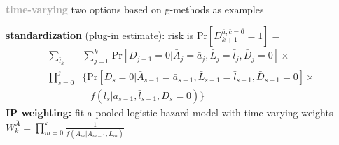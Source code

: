 \documentclass[8pt,twoside]{extarticle}
\begin{document}
\begin{multicols}{2}
\vspace{0.2em}
\noindent \colorbox{lightgray!20!white}{\begin{minipage}{28em}




\textbf{\textcolor{darkgray}{time-varying}} two options based on g-methods as examples

\noindent \textbf{standardization} (plug-in estimate): risk is $\mathrm{Pr}\left[D_{k+1}^{\bar{a},\bar{c}=\bar{0}}=1\right] =$ \vspace{-0.5em}
\begin{align*}%
 \sum_{\bar{l}_k}&\sum_{j=0}^k \mathrm{Pr}\left[D_{j+1}=0|\bar{A}_j=\bar{a}_j, \bar{L}_j=\bar{l}_j, \bar{D}_j=0\right] \times \\[-0.1em]
\prod_{s=0}^j & \Big\{  \mathrm{Pr}\left[D_s=0|\bar{A}_{s-1}=\bar{a}_{s-1}, \bar{L}_{s-1}=\bar{l}_{s-1}, \bar{D}_{s-1}=0\right] \times  \\[-0.7em]
   &   \,\,\,\,\, f\left(l_s|\bar{a}_{s-1}, \bar{l}_{s-1}, D_s=0\right)\Big\}
\end{align*}
\noindent \textbf{IP weighting:} fit a pooled logistic hazard model with time-varying weights
$W^{\bar{A}}_k =\prod_{m=0}^k\frac{1}{f(A_m|\bar{A}_{m-1}, \bar{L}_m)}$



\end{minipage}}



\end{multicols}




\end{document}

